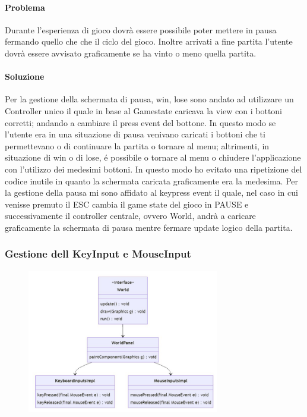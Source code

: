 \documentclass[a4paper,12pt]{report}
\begin{document}
\paragraph{Problema} Durante l’esperienza di gioco dovrà essere possibile poter mettere in pausa fermando quello che che il ciclo del gioco. Inoltre arrivati a fine partita l’utente dovrà essere avvisato graficamente se ha vinto o meno quella partita.

\paragraph{Soluzione} Per la gestione della schermata di pausa, win, lose sono andato ad utilizzare un Controller unico il quale in base al Gamestate caricava la view con i bottoni corretti; andando a cambiare il press event del bottone. In questo modo se l’utente era in una situazione di pausa venivano caricati i bottoni che ti permettevano o di continuare la partita o tornare al menu; altrimenti, in situazione di win o di lose, é possibile o tornare al menu o chiudere l’applicazione con l’utilizzo dei medesimi bottoni. In questo modo ho evitato una ripetizione del codice inutile in quanto la schermata caricata graficamente era la medesima. Per la gestione della pausa mi sono affidato al keypress event il quale, nel caso in cui venisse premuto il ESC cambia il game state del gioco in PAUSE e successivamente il controller centrale, ovvero World, andrà a caricare graficamente la schermata di pausa mentre fermare update logico della partita.

\subsubsection{Gestione dell KeyInput e MouseInput}
\begin{figure}[H]
    \centering{}
    \includegraphics[width=0.75\textwidth]{img/UMLGestioneInput.png}
    \caption{}
\end{figure}
\end{document}
